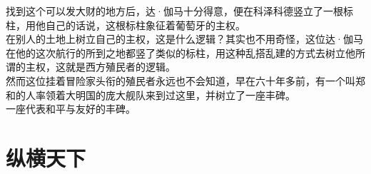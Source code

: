 \begin{multicols}{\theparacolNo}
找到这个可以发大财的地方后，达·伽马十分得意，便在科泽科德竖立了一根标柱，用他自己的话说，这根标柱象征着葡萄牙的主权。\\

在别人的土地上树立自己的主权，这是什么逻辑？其实也不用奇怪，这位达·伽马在他的这次航行的所到之地都竖了类似的标柱，用这种乱搭乱建的方式去树立他所谓的主权，这就是西方殖民者的逻辑。\\

然而这位挂着冒险家头衔的殖民者永远也不会知道，早在六十年多前，有一个叫郑和的人率领着大明国的庞大舰队来到过这里，并树立了一座丰碑。\\

一座代表和平与友好的丰碑。\\
\ifnum{}
	\end{multicols}
\fi
\newpage
\section{纵横天下}
\ifnum{}
